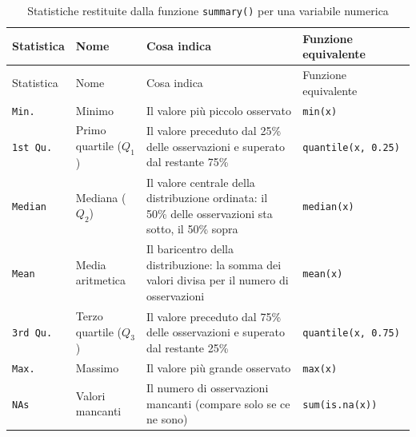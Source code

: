 \documentclass[
  a4paper,
  DIV=11,
  numbers=noendperiod]{scrreprt}
\begin{document}
\begin{longtable}[]{@{}
  >{\raggedright\arraybackslash}p{}
  >{\raggedright\arraybackslash}p{}
  >{\raggedright\arraybackslash}p{}
  >{\raggedright\arraybackslash}p{}@{}}
\caption{Statistiche restituite dalla funzione \texttt{summary()} per
una variabile numerica}\label{tbl-summary}\tabularnewline
\toprule\noalign{}
\begin{minipage}[b]{\linewidth}\raggedright
Statistica
\end{minipage} & \begin{minipage}[b]{\linewidth}\raggedright
Nome
\end{minipage} & \begin{minipage}[b]{\linewidth}\raggedright
Cosa indica
\end{minipage} & \begin{minipage}[b]{\linewidth}\raggedright
Funzione equivalente
\end{minipage} \\
\midrule\noalign{}
\endfirsthead
\toprule\noalign{}
\begin{minipage}[b]{\linewidth}\raggedright
Statistica
\end{minipage} & \begin{minipage}[b]{\linewidth}\raggedright
Nome
\end{minipage} & \begin{minipage}[b]{\linewidth}\raggedright
Cosa indica
\end{minipage} & \begin{minipage}[b]{\linewidth}\raggedright
Funzione equivalente
\end{minipage} \\
\midrule\noalign{}
\endhead
\bottomrule\noalign{}
\endlastfoot
\texttt{Min.} & Minimo & Il valore più piccolo osservato &
\texttt{min(x)} \\
\texttt{1st\ Qu.} & Primo quartile (\(Q_1\)) & Il valore preceduto dal
25\% delle osservazioni e superato dal restante 75\% &
\texttt{quantile(x,\ 0.25)} \\
\texttt{Median} & Mediana (\(Q_2\)) & Il valore centrale della
distribuzione ordinata: il 50\% delle osservazioni sta sotto, il 50\%
sopra & \texttt{median(x)} \\
\texttt{Mean} & Media aritmetica & Il baricentro della distribuzione: la
somma dei valori divisa per il numero di osservazioni &
\texttt{mean(x)} \\
\texttt{3rd\ Qu.} & Terzo quartile (\(Q_3\)) & Il valore preceduto dal
75\% delle osservazioni e superato dal restante 25\% &
\texttt{quantile(x,\ 0.75)} \\
\texttt{Max.} & Massimo & Il valore più grande osservato &
\texttt{max(x)} \\
\texttt{NA\textquotesingle{}s} & Valori mancanti & Il numero di
osservazioni mancanti (compare solo se ce ne sono) &
\texttt{sum(is.na(x))} \\
\end{longtable}
\end{document}
